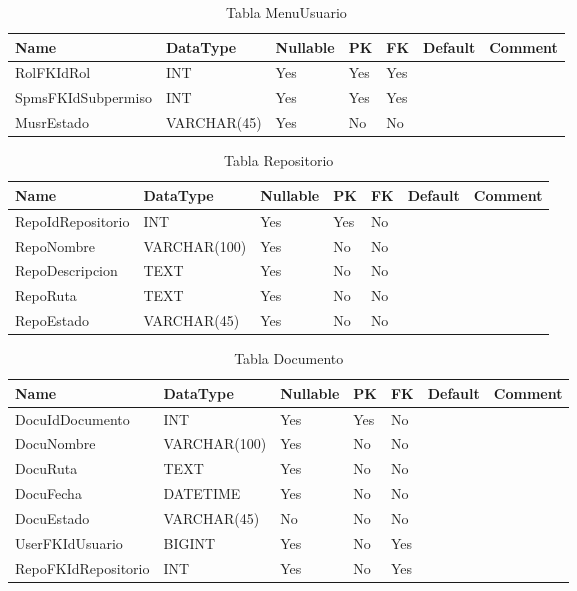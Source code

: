 \begin{table}
	\caption{Tabla MenuUsuario}
	\label{labelTableMenuUsuario}
	\begin{tabular}{ |l|l|l|l|l|l|l| }
		\hline
		Name & DataType & Nullable & PK & FK & Default & Comment \\ \hline
		RolFKIdRol & INT & Yes & Yes & Yes &  & \\ \hline 
		SpmsFKIdSubpermiso & INT & Yes & Yes & Yes &  & \\ \hline 
		MusrEstado & VARCHAR(45) & Yes & No & No &  & \\ \hline 
		
	\end{tabular}
\end{table}


\begin{table}
	\caption{Tabla Repositorio}
	\label{labelTableRepositorio}
	\begin{tabular}{ |l|l|l|l|l|l|l| }
		\hline
		Name & DataType & Nullable & PK & FK & Default & Comment \\ \hline
		RepoIdRepositorio & INT & Yes & Yes & No &  & \\ \hline 
		RepoNombre & VARCHAR(100) & Yes & No & No &  & \\ \hline 
		RepoDescripcion & TEXT & Yes & No & No &  & \\ \hline 
		RepoRuta & TEXT & Yes & No & No &  & \\ \hline 
		RepoEstado & VARCHAR(45) & Yes & No & No &  & \\ \hline 
		
	\end{tabular}
\end{table}


\begin{table}
	\caption{Tabla Documento}
	\label{labelTableDocumento}
	\begin{tabular}{ |l|l|l|l|l|l|l| }
		\hline
		Name & DataType & Nullable & PK & FK & Default & Comment \\ \hline
		DocuIdDocumento & INT & Yes & Yes & No &  & \\ \hline 
		DocuNombre & VARCHAR(100) & Yes & No & No &  & \\ \hline 
		DocuRuta & TEXT & Yes & No & No &  & \\ \hline 
		DocuFecha & DATETIME & Yes & No & No &  & \\ \hline 
		DocuEstado & VARCHAR(45) & No & No & No &  & \\ \hline 
		UserFKIdUsuario & BIGINT & Yes & No & Yes &  & \\ \hline 
		RepoFKIdRepositorio & INT & Yes & No & Yes &  & \\ \hline 
		
	\end{tabular}
\end{table}



